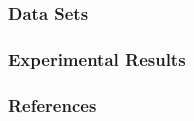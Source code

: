 \documentclass{beamer}
\begin{document}
\begin{frame}
\frametitle{Data Sets}
\end{frame}

\begin{frame}
\frametitle{Experimental Results}
\end{frame}

\begin{frame}
\frametitle{References}
\end{frame}
\end{document}
